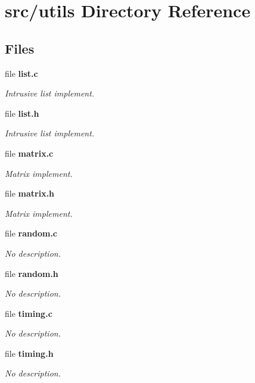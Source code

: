 \section{src/utils Directory Reference}
\label{dir_313caf1132e152dd9b58bea13a4052ca}
\subsection*{Files}
\begin{DoxyCompactItemize}
\item 
file \textbf{ list.\+c}
\begin{DoxyCompactList}\small\item\em Intrusive list implement. \end{DoxyCompactList}\item 
file \textbf{ list.\+h}
\begin{DoxyCompactList}\small\item\em Intrusive list implement. \end{DoxyCompactList}\item 
file \textbf{ matrix.\+c}
\begin{DoxyCompactList}\small\item\em Matrix implement. \end{DoxyCompactList}\item 
file \textbf{ matrix.\+h}
\begin{DoxyCompactList}\small\item\em Matrix implement. \end{DoxyCompactList}\item 
file \textbf{ random.\+c}
\begin{DoxyCompactList}\small\item\em No description. \end{DoxyCompactList}\item 
file \textbf{ random.\+h}
\begin{DoxyCompactList}\small\item\em No description. \end{DoxyCompactList}\item 
file \textbf{ timing.\+c}
\begin{DoxyCompactList}\small\item\em No description. \end{DoxyCompactList}\item 
file \textbf{ timing.\+h}
\begin{DoxyCompactList}\small\item\em No description. \end{DoxyCompactList}\end{DoxyCompactItemize}
